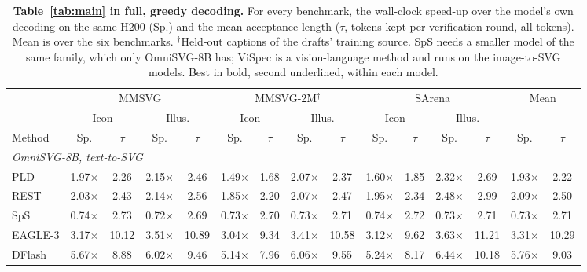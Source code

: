 \begin{table}[t]
\caption{\textbf{Table~\ref{tab:main} in full, greedy decoding.} For every benchmark, the wall-clock speed-up over the model's own decoding on the same H200 (Sp.) and the mean acceptance length ($\tau$, tokens kept per verification round, all tokens). Mean is over the six benchmarks. $^\dagger$Held-out captions of the drafts' training source. SpS needs a smaller model of the same family, which only OmniSVG-8B has; ViSpec is a vision-language method and runs on the image-to-SVG models. Best in bold, second underlined, within each model.}
\label{app:t1-greedy}
\centering
\footnotesize
\setlength{\tabcolsep}{1.5pt}
\begin{tabular*}{\textwidth}{@{\extracolsep{\fill}}l*{14}{c}@{}}
\toprule
 & \multicolumn{4}{c}{MMSVG} & \multicolumn{4}{c}{MMSVG-2M$^\dagger$} & \multicolumn{4}{c}{SArena} & \multicolumn{2}{c}{Mean} \\
\cmidrule(lr){2-5}\cmidrule(lr){6-9}\cmidrule(lr){10-13}\cmidrule(lr){14-15}
 & \multicolumn{2}{c}{Icon} & \multicolumn{2}{c}{Illus.} & \multicolumn{2}{c}{Icon} & \multicolumn{2}{c}{Illus.} & \multicolumn{2}{c}{Icon} & \multicolumn{2}{c}{Illus.} & \multicolumn{2}{c}{} \\
\cmidrule(lr){2-3}\cmidrule(lr){4-5}\cmidrule(lr){6-7}\cmidrule(lr){8-9}\cmidrule(lr){10-11}\cmidrule(lr){12-13}
Method & Sp. & $\tau$ & Sp. & $\tau$ & Sp. & $\tau$ & Sp. & $\tau$ & Sp. & $\tau$ & Sp. & $\tau$ & Sp. & $\tau$ \\
\midrule
\multicolumn{15}{l}{\textit{OmniSVG-8B, text-to-SVG}} \\
PLD & 1.97$\times$ & 2.26 & 2.15$\times$ & 2.46 & 1.49$\times$ & 1.68 & 2.07$\times$ & 2.37 & 1.60$\times$ & 1.85 & 2.32$\times$ & 2.69 & 1.93$\times$ & 2.22 \\
REST & 2.03$\times$ & 2.43 & 2.14$\times$ & 2.56 & 1.85$\times$ & 2.20 & 2.07$\times$ & 2.47 & 1.95$\times$ & 2.34 & 2.48$\times$ & 2.99 & 2.09$\times$ & 2.50 \\
SpS & 0.74$\times$ & 2.73 & 0.72$\times$ & 2.69 & 0.73$\times$ & 2.70 & 0.73$\times$ & 2.71 & 0.74$\times$ & 2.72 & 0.73$\times$ & 2.71 & 0.73$\times$ & 2.71 \\
EAGLE-3 & 3.17$\times$ & 10.12 & 3.51$\times$ & 10.89 & 3.04$\times$ & 9.34 & 3.41$\times$ & 10.58 & 3.12$\times$ & 9.62 & 3.63$\times$ & 11.21 & 3.31$\times$ & 10.29 \\
DFlash & 5.67$\times$ & 8.88 & 6.02$\times$ & 9.46 & 5.14$\times$ & 7.96 & 6.06$\times$ & 9.55 & 5.24$\times$ & 8.17 & 6.44$\times$ & 10.18 & 5.76$\times$ & 9.03 \\

\end{tabular*}
\end{table}
